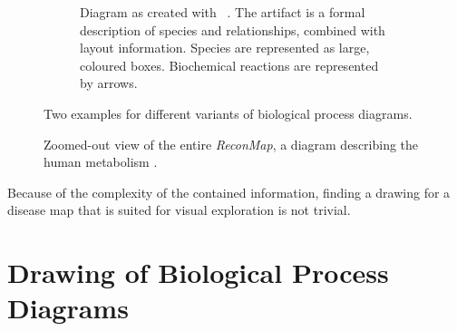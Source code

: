 \documentclass[
	fontsize=10pt, %
	twoside=true, %
	secnumdepth=1, %
  toc=indentunnumbered %
]{kaobook}
\begin{document}
\begin{figure}[h]
\begin{subfigure}{0.4\textwidth}
    \caption{Diagram as created with
      ~\cite{_CellDesignerProcessDiagram_}. The artifact is a formal description of
      species and relationships, combined with layout information. 
      Species are represented as large, coloured boxes.
      Biochemical reactions are represented by arrows. }
    \label{fig:process-diagram-old-vs-new:celldesigner}
  \end{subfigure}
  \caption{
    Two examples for different variants of biological process diagrams.
  }
  \label{fig:process-diagram-old-vs-new}
\end{figure}

\begin{figure}[h]
  \centering
  \caption[Screenshot of the \textit{ReconMap}]{Zoomed-out view of the entire \textit{ReconMap}, a
    diagram describing the human metabolism
    \cite{noronha_ReconMapInteractiveVisualization_2017}.}
  \label{fig:disease-map-example}
\end{figure}

Because of the complexity of the contained information, finding a drawing for a
disease map that is suited for visual exploration is not trivial.


\section{Drawing of Biological Process Diagrams}
\label{sec:draw-biol-netw}
\end{document}
